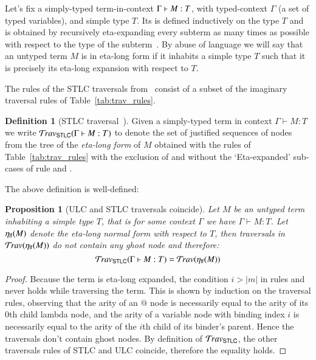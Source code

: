 \documentclass{elsarticle}
\theoremstyle{plain}
\newtheorem{proposition}[theorem]{Proposition}
\theoremstyle{definition}
\newtheorem{definition}{Definition}[section]
\theoremstyle{remark}
\newcommand{\ghostlmd}{{\lambda\!\!\lambda}}
\newcommand{\travulc}{\travset}
\newcommand{\travstlc}{{\travset_{\sf STLC}}}
\begin{document}
Let's fix a simply-typed term-in-context $\Gamma \vdash M :T$, with typed-context $\Gamma$ (a set of typed variables), and simple type $T$. Its  is defined inductively on the type $T$ and is obtained by recursively eta-expanding every subterm as many times as possible with respect to the type of the subterm~\cite{Ong2006,BlumPhd}.
By abuse of language we will say that an untyped term $M$ is in eta-long form if it inhabits a simple type $T$ such that it is precisely its eta-long expansion with respect to $T$.

The rules of the STLC traversals from~\cite{BlumPhd} consist of a subset of the imaginary traversal rules of Table~\ref{tab:trav_rules}.

\begin{definition}[STLC traversal~\cite{BlumPhd}]
Given a simply-typed term in context $\Gamma \vdash M : T$ we write $\travstlc(\Gamma \vdash M : T)$ to denote the set of justified sequences of nodes from the tree of the \emph{eta-long form} of $M$ obtained with the rules of Table~\ref{tab:trav_rules} with the exclusion of \rulenamet{Lam^\ghostlmd} and without the `Eta-expanded' sub-cases of rule  and .
\end{definition}

The above definition is well-defined:
\begin{proposition}[ULC and STLC traversals coincide]
\label{prop:ulc_and_stlc_trav_coincide}
Let $M$ be an untyped term inhabiting a simple type $T$, that is for some context $\Gamma$ we have $\Gamma \vdash M : T$. Let $\eta_{\sf lf}(M)$ denote the \emph{eta-long normal form} with respect to $T$, then traversals in $\travulc(\etalf{M})$ do not contain any ghost node and therefore:
$$\travstlc(\Gamma \vdash M : T) = \travulc(\etalf{M})$$
\end{proposition}
\begin{proof}
Because the term is eta-long expanded, the condition $i>|m|$ in rules  and  never holds while traversing the term. This is shown by induction on the traversal rules, observing that the arity of an $@$ node is necessarily equal to the arity of its $0$th child lambda node, and the arity of a variable node with binding index $i$ is necessarily equal to the arity of the $i$th child of its binder's parent. Hence the traversals don't contain ghost nodes. By definition of $\travstlc$, the other traversals rules of STLC and ULC coincide, therefore the equality holds.
\end{proof}
\end{document}
